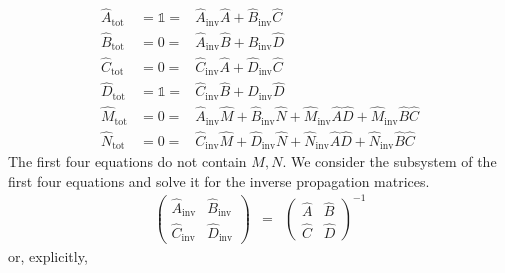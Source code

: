 \documentclass[12pt,a4paper,twoside,openright,BCOR10mm,headsepline,titlepage,abstracton,chapterprefix,final]{scrreprt}
\newcommand\unittensor{\mathds{1}}
\newcommand\tot{\textrm{tot}}
\begin{document}
\begin{subequations}
\begin{eqnarray}
 \hat{A}_\tot &= \unittensor =& \hat{A}_{\text{inv}} \hat{A} + \hat{B}_{\text{inv}} \hat{C} \\
 \hat{B}_\tot &= 0           =& \hat{A}_{\text{inv}} \hat{B} + \hat{B}_{\text{inv}} \hat{D} \\
 \hat{C}_\tot &= 0           =& \hat{C}_{\text{inv}} \hat{A} + \hat{D}_{\text{inv}} \hat{C}\\
 \hat{D}_\tot &= \unittensor =& \hat{C}_{\text{inv}} \hat{B} + \hat{D}_{\text{inv}} \hat{D} \\
 \hat{M}_\tot &= 0           =& \hat{A}_{\text{inv}} \hat{M} + \hat{B}_{\text{inv}} \hat{N} + \hat{M}_{\text{inv}} \hat{A} \hat{D} + \hat{M}_{\text{inv}} \hat{B} \hat{C} \label{eq:inverse_prop_fifth_equation}\\
 \hat{N}_\tot &= 0           =& \hat{C}_{\text{inv}} \hat{M} + \hat{D}_{\text{inv}} \hat{N} + \hat{N}_{\text{inv}} \hat{A} \hat{D} + \hat{N}_{\text{inv}} \hat{B} \hat{C} \label{eq:inverse_prop_sixth_equation}
\end{eqnarray}
\end{subequations}
The first four equations do not contain $M,N$.
We consider the subsystem of the first four equations and solve it for the inverse propagation matrices.
\begin{eqnarray}
 \begin{pmatrix}
  \hat{A}_{\text{inv}} & \hat{B}_{\text{inv}} \\ \hat{C}_{\text{inv}} & \hat{D}_{\text{inv}}
 \end{pmatrix}
 &=&
 \begin{pmatrix}
  \hat{A} & \hat{B} \\ \hat{C} & \hat{D}
 \end{pmatrix}^{-1}
\end{eqnarray}
or, explicitly,
\end{document}
